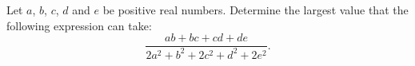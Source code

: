 Let $a$, $b$, $c$, $d$ and $e$ be positive real numbers.
Determine the largest value that the following expression can take:
$$\frac{ab+bc+cd+de}{2a^2+b^2+2c^2+d^2+2e^2}.$$
